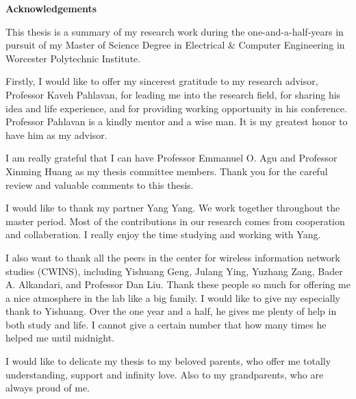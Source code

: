 \documentclass[12pt]{report}
\begin{document}


%
\begin{center}
	\textbf{Acknowledgements}
\end{center}
This thesis is a summary of my research work during the one-and-a-half-years in pursuit of my Master of Science Degree in Electrical \& Computer Engineering in Worcester Polytechnic Institute.

Firstly, I would like to offer my sincerest gratitude to my research advisor, Professor Kaveh Pahlavan, for leading me into the research field, for sharing his idea and life experience, and for providing working opportunity in his conference. Professor Pahlavan is a kindly mentor and a wise man. It is my greatest honor to have him as my advisor. 

I am really grateful that I can have Professor Emmanuel O. Agu and Professor Xinming Huang as my thesis committee members. Thank you for the careful review and valuable comments to this thesis. 

I would like to thank my partner Yang Yang. We work together throughout the master period. Most of the contributions in our research comes from cooperation and collaberation. I really enjoy the time studying and working with Yang.

I also want to thank all the peers in the center for wireless information network studies (CWINS), including Yishuang Geng, Julang Ying, Yuzhang Zang, Bader A. Alkandari, and Professor Dan Liu. Thank these people so much for offering me a nice atmosphere in the lab like a big family. I would like to give my especially thank to Yishuang. Over the one year and a half, he gives me plenty of help in both study and life. I cannot give a certain number that how many times he helped me until midnight. 

I would like to delicate my thesis to my beloved parents, who offer me totally understanding, support and infinity love. Also to my grandparents, who are always proud of me.


\clearpage


\end{document}
